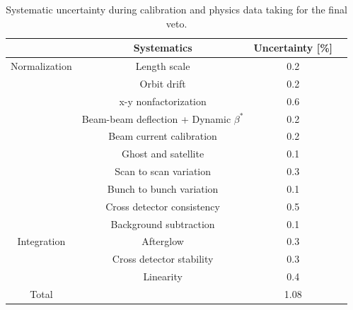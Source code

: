 \begin{table}[htbp]
  \centering
  \caption[2018 Luminosity systematic uncertainty]{Systematic uncertainty during calibration and physics data taking for the final veto.}
\label{tab:systematic-uncertainty}
\begin{tabular}{cccc}
  \textbf{}&\textbf{Systematics} &\textbf{Uncertainty [\%]} \\
\hline
Normalization & Length scale & 0.2  \\
 & Orbit drift &  0.2  \\
 & x-y nonfactorization & 0.6 \\
 & Beam-beam deflection + Dynamic $\beta^{*}$  & 0.2 \\
 & Beam current calibration  & 0.2 \\
 & Ghost and satellite & 0.1 \\
 & Scan to scan variation & 0.3 \\
 & Bunch to bunch variation & 0.1 \\
 & Cross detector consistency  & 0.5 \\
 & Background subtraction  & 0.1 \\
Integration & Afterglow  &  0.3 \\
 & Cross detector stability & 0.3 \\
 & Linearity  & 0.4 \\
Total &  &  1.08 \\
\end{tabular}
\label{tab:systematic-uncertainty}
\end{table}

